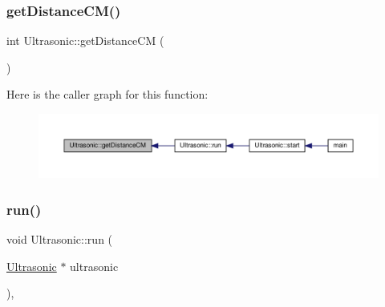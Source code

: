 \subsubsection{\texorpdfstring{get\+Distance\+C\+M()}{getDistanceCM()}}
{\footnotesize\ttfamily int Ultrasonic\+::get\+Distance\+CM (\begin{DoxyParamCaption}{ }\end{DoxyParamCaption})\hspace{0.3cm}{\ttfamily [private]}}

Here is the caller graph for this function\+:
\nopagebreak
\begin{figure}[H]
\begin{center}
\leavevmode
\includegraphics[width=350pt]{classUltrasonic_a7af95864d8b2b58d56e661e0fcb4ca8b_icgraph}
\end{center}
\end{figure}
\mbox{\label{classUltrasonic_ac1df91b01624260ce4c19126e3aa0160}} 
\subsubsection{\texorpdfstring{run()}{run()}}
{\footnotesize\ttfamily void Ultrasonic\+::run (\begin{DoxyParamCaption}\item[{\hyperlink{classUltrasonic}{Ultrasonic} $\ast$}]{ultrasonic }\end{DoxyParamCaption})\hspace{0.3cm}{\ttfamily [static]}, {\ttfamily [private]}}

